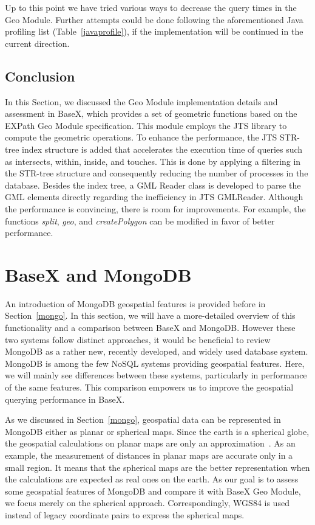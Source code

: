 \documentclass[a4paper,12pt]{article}
\begin{document}
Up to this point we have tried various ways to decrease the query times in the Geo Module. Further attempts could be done following the aforementioned Java profiling list (Table~\ref{javaprofile}), if the implementation will be continued in the current direction.

\subsection{Conclusion}
\label{BXconc}
In this Section, we discussed the Geo Module implementation details and assessment in BaseX, which provides a set of geometric functions based on the EXPath Geo Module specification. This module employs the JTS library to compute the geometric operations. To enhance the performance, the JTS STR-tree index structure is added that accelerates the execution time of queries such as intersects, within, inside, and touches. This is done by applying a filtering in the STR-tree structure and consequently reducing the number of processes in the database. Besides the index tree, a GML Reader class is developed to parse the GML elements directly regarding the inefficiency in JTS GMLReader. Although the performance is convincing, there is room for improvements. For example, the functions \textit{split}, \textit{geo}, and \textit{createPolygon} can be modified in favor of better performance.

\newpage
\section{BaseX and MongoDB}
\label{s.mongo}

An introduction of MongoDB geospatial features is provided before in Section~\ref{mongo}. In this section, we will have a more-detailed overview of this functionality and a comparison between BaseX and MongoDB. However these two systems follow distinct approaches, it would be beneficial to review MongoDB as a rather new, recently developed, and widely used database system. MongoDB is among the few NoSQL systems providing geospatial features. Here, we will mainly see differences between these systems, particularly in performance of the same features. This comparison empowers us to improve the geospatial querying performance in BaseX. 

As we discussed in Section~\ref{mongo}, geospatial data can be represented in MongoDB either as planar or spherical maps. Since the earth is a spherical globe, the geospatial calculations on planar maps are only an approximation~\cite{coordsys,coordsys-mongo}. As an example, the measurement of distances in planar maps are accurate only in a small region. It means that the spherical maps are the better representation when the calculations are expected as real ones on the earth. As our goal is to assess some geospatial features of MongoDB and compare it with BaseX Geo Module, we focus merely on the spherical approach. Correspondingly, WGS84 is used instead of legacy coordinate pairs to express the spherical maps. 
\end{document}
